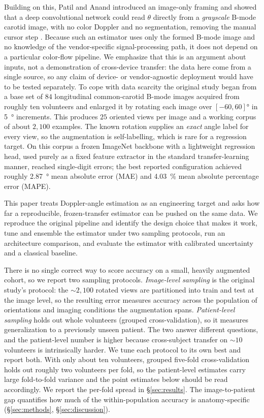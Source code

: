 Building on this, Patil and Anand introduced an image-only framing and showed that
a deep convolutional network could read $\theta$ directly from a \emph{grayscale}
B-mode carotid image, with no color Doppler and no segmentation, removing the
manual cursor step \citep{Patil2019}. Because such an estimator uses only the
formed B-mode image and no knowledge of the vendor-specific signal-processing
path, it does not depend on a particular color-flow pipeline. We emphasize that
this is an argument about inputs, not a demonstration of cross-device transfer:
the data here come from a single source, so any claim of device- or
vendor-agnostic deployment would have to be tested separately. To cope with data
scarcity the original study began from a base set of $84$ longitudinal
common-carotid B-mode images acquired from roughly ten volunteers and enlarged it
by rotating each image over $[-60,60]\si{\degree}$ in \SI{5}{\degree} increments.
This produces $25$ oriented views per image and a working corpus of about
$2{,}100$ examples. The known rotation supplies an \emph{exact} angle label for
every view, so the augmentation is self-labelling, which is rare for a regression
target. On this corpus a frozen ImageNet backbone \citep{Deng2009} with a
lightweight regression head, used purely as a fixed feature extractor in the
standard transfer-learning manner, reached single-digit errors; the best reported
configuration achieved roughly \SI{2.87}{\degree} mean absolute error (MAE) and
\SI{4.03}{\percent} mean absolute percentage error (MAPE).

This paper treats Doppler-angle estimation as an engineering target and asks how
far a reproducible, frozen-transfer estimator can be pushed on the same data. We
reproduce the original pipeline and identify the design choice that makes it work,
tune and ensemble the estimator under two sampling protocols, run an architecture
comparison, and evaluate the estimator with calibrated uncertainty and a classical
baseline.

There is no single correct way to score accuracy on a small, heavily augmented
cohort, so we report two sampling protocols. \emph{Image-level sampling} is the
original study's protocol: the $\sim\!2{,}100$ rotated views are partitioned into
train and test at the image level, so the resulting error measures accuracy across
the population of orientations and imaging conditions the augmentation spans.
\emph{Patient-level sampling} holds out whole volunteers (grouped
cross-validation), so it measures generalization to a previously unseen patient.
The two answer different questions, and the patient-level number is higher because
cross-subject transfer on $\sim\!10$ volunteers is intrinsically harder. We tune
each protocol to its own best and report both. With only about ten volunteers,
grouped five-fold cross-validation holds out roughly two volunteers per fold, so
the patient-level estimates carry large fold-to-fold variance and the point
estimates below should be read accordingly. We report the per-fold spread in
\S\ref{sec:results}. The image-to-patient gap quantifies how much of the
within-population accuracy is anatomy-specific
(\S\ref{sec:methods}, \S\ref{sec:discussion}).

